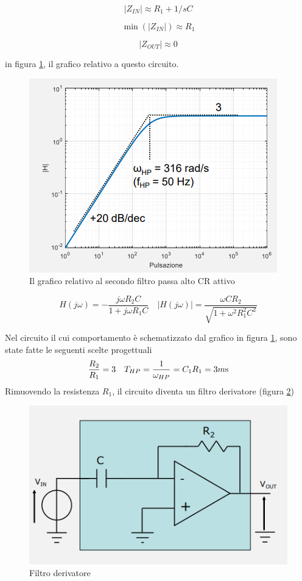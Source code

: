 \documentclass{article}
\begin{document}
\[|Z_{IN}| \approx R_1 + 1/sC\]

\[\min (|Z_{IN}|) \approx R_1\]

\[|Z_{OUT}| \approx 0\]

in figura \ref{Schema_filtro_passa_alto_CR_attivo_grafici}, il grafico relativo a questo circuito.

\begin{figure}[h]
  \centering
  \includegraphics[scale=0.6]{IM_filtro_passa_alto_CR_attivo_grafici}
  \caption{Il grafico relativo al secondo filtro passa alto CR attivo}
  \label{Schema_filtro_passa_alto_CR_attivo_grafici}
\end{figure}

\[H(j \omega) = - \frac{j \omega R_2 C}{1 + j \omega R_1 C} \quad |H(j \omega)| = \frac{\omega C R_2}{\sqrt{1 + \omega ^2 R^2_1 C^2}}\]

Nel circuito il cui comportamento è schematizzato dal grafico in figura \ref{Schema_filtro_passa_alto_CR_attivo_grafici}, sono state fatte le seguenti scelte progettuali
\begin{align*}
\frac{R_2}{R_1} = 3 && T_{HP} = \frac{1}{\omega _{HP}} = C_1 R_1 = 3 m \textrm s
\end{align*}  
\clearpage
Rimuovendo la resistenza $R_1$, il circuito diventa un filtro derivatore (figura \ref{Schema_filtro_derivatore})

\begin{figure}[h]
  \centering
  \includegraphics[scale=0.55]{IM_filtro_derivatore}
  \caption{Filtro derivatore}
  \label{Schema_filtro_derivatore}
\end{figure}
\end{document}
